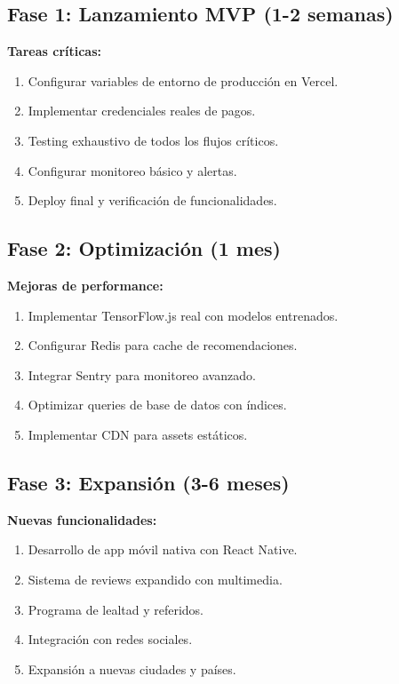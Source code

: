 \documentclass[a4paper,12pt]{article}
\begin{document}
\subsection{Fase 1: Lanzamiento MVP (1-2 semanas)}
\textbf{Tareas críticas:}
\begin{enumerate}
  \item Configurar variables de entorno de producción en Vercel.
  \item Implementar credenciales reales de pagos.
  \item Testing exhaustivo de todos los flujos críticos.
  \item Configurar monitoreo básico y alertas.
  \item Deploy final y verificación de funcionalidades.
\end{enumerate}

\subsection{Fase 2: Optimización (1 mes)}
\textbf{Mejoras de performance:}
\begin{enumerate}
  \item Implementar TensorFlow.js real con modelos entrenados.
  \item Configurar Redis para cache de recomendaciones.
  \item Integrar Sentry para monitoreo avanzado.
  \item Optimizar queries de base de datos con índices.
  \item Implementar CDN para assets estáticos.
\end{enumerate}

\subsection{Fase 3: Expansión (3-6 meses)}
\textbf{Nuevas funcionalidades:}
\begin{enumerate}
  \item Desarrollo de app móvil nativa con React Native.
  \item Sistema de reviews expandido con multimedia.
  \item Programa de lealtad y referidos.
  \item Integración con redes sociales.
  \item Expansión a nuevas ciudades y países.
\end{enumerate}

\end{document}
